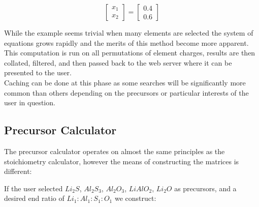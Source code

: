 \documentclass[a4paper, 12pt]{article}
\begin{document}
\begin{minipage}{0.4\textwidth}
	\begin{equation*}
	\begin{bmatrix}
	x_1 \\
	x_2
	\end{bmatrix}
	=
	\begin{bmatrix}
	0.4 \\
	0.6
	\end{bmatrix}
	\end{equation*}
\end{minipage}
\hfill
\begin{minipage}{0.6\textwidth}
	While the example seems trivial when many elements are selected the system of equations grows rapidly and the merits of this method become more apparent. \\
	
	This computation is run on all permutations of element charges, results are then collated, filtered, and then passed back to the web server where it can be presented to the user. \\
	
	Caching can be done at this phase as some searches will be significantly more common than others depending on the precursors or particular interests of the user in question. 
\end{minipage}

\subsection{Precursor Calculator}
The precursor calculator operates on almost the same principles as the stoichiometry calculator, however the means of constructing the matrices is different:

\begin{center}
	If the user selected $Li_2S$, $Al_2S_3$, $Al_2O_3$, $LiAlO_2$, $Li_2O$ as precursors, and a desired end ratio of $Li_1 : Al_1 : S_1 : O_1$ we construct:
\end{center}
\end{document}
